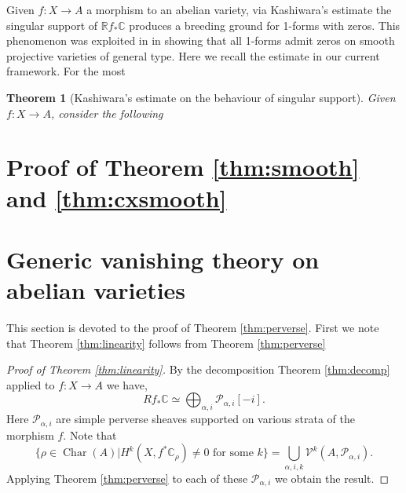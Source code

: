 \documentclass[12pt,reqno]{amsart}
\newtheorem{theorem}{Theorem}[section]
\theoremstyle{question}
\theoremstyle{definition}
\theoremstyle{remark}
\theoremstyle{cited}
\theoremstyle{citeddef}
\DeclareMathOperator{\Char}{Char}
\newcommand{\sP}{\mathcal{P}}
\newcommand\sV{{\mathcal V}}
\newcommand{\bbC}{\mathbb{C}}
\newcommand{\bbR}{\mathbb{R}}
\begin{document}
Given $f\colon X\to A$ a morphism to an abelian
variety, via Kashiwara's estimate the singular support of $\bbR f_*\bbC$ produces a breeding ground for 1-forms with zeros. This phenomenon was exploited in
\cite{PS14}
in showing that all 1-forms admit zeros on smooth projective
varieties of general type. Here we recall the estimate in our
current framework. For the most 
\begin{theorem}[Kashiwara's estimate on the behaviour of singular support]
Given $f\colon X\to A$, consider the following

\label{thm:}
\end{theorem}






\section{Proof of Theorem \ref{thm:smooth} and \ref{thm:cxsmooth}}



















\section{Generic vanishing theory on abelian varieties}
This section is devoted to the proof of Theorem \ref{thm:perverse}. First we note that Theorem \ref{thm:linearity} follows
from Theorem \ref{thm:perverse}


\begin{proof}[Proof of Theorem \ref{thm:linearity}]
By the decomposition Theorem \ref{thm:decomp} applied to $f\colon X\to A$
we have, 
\[Rf_*\bbC\simeq \bigoplus_{\alpha,i} \sP_{\alpha,i}[-i].\]
Here $\sP_{\alpha, i}$ are simple perverse sheaves supported on various strata of the morphism $f$. 
Note that
\[\{\rho\in \Char(A)| H^k(X, f^*\bbC_{\rho})\neq 0 \text{ for some } k\} = \bigcup_{\alpha, i, k}\sV^k(A, \sP_{\alpha, i}).\]
Applying Theorem \ref{thm:perverse} to each 
of these $\sP_{\alpha,i}$ we obtain the result.
\end{proof}
\end{document}
